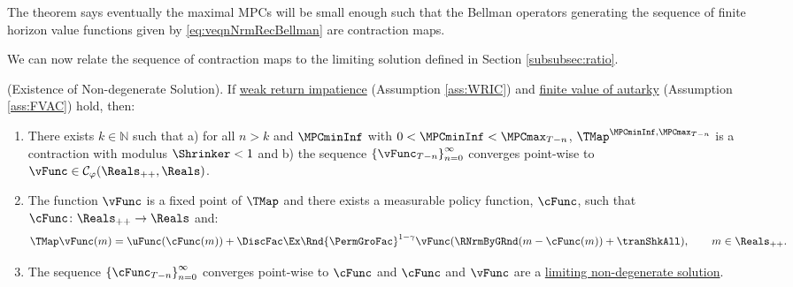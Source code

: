 \documentclass[BufferStockTheory]{subfiles}
\begin{document}
The theorem says eventually the maximal MPCs will be small enough such that the Bellman operators generating the sequence of finite horizon value functions given by \eqref{eq:veqnNrmRecBellman} are contraction maps.

We can now relate the sequence of contraction maps to the limiting solution defined in Section \ref{subsubsec:ratio}.

\hypertarget{Sufficient-Conditions-For-non-degenerate-Solution}{}
\begin{theorem}(Existence of Non-degenerate Solution).
\label{thm:convgtobellman}
If \hyperlink{WRIC}{weak return impatience} (Assumption \ref{ass:WRIC}) and \hyperlink{FVAC}{finite value of autarky} (Assumption \ref{ass:FVAC}) hold, then:
%
\begin{enumerate}[label=(\roman*)]
\item There exists $k\in \mathbb{N}$ such that a) for all $n>k$ and $\MPCminInf$ with $0<\MPCminInf<\MPCmax_{T-n}$, $\TMap^{\MPCminInf, \MPCmax_{T-n}}$ is a contraction with modulus $\Shrinker<1$ and b) the sequence $\left\{\vFunc_{T-n}\right\}_{n=0}^{\infty}$ converges point-wise to $\vFunc \in \mathcal{C}_{\boundFunc}(\Reals_{++},\Reals)$.
\item The function $\vFunc$ is a fixed point of $\TMap$ and there exists a measurable policy function, $\cFunc$, such that $\cFunc\colon \Reals_{++}\rightarrow \Reals$ and:
\begin{equation}\label{eq:stationarybellman}
\TMap\vFunc(m) =  \uFunc(\cFunc(m)) + \DiscFac\Ex \Rnd{\PermGroFac}^{1-\CRRA}\vFunc(\RNrmByGRnd(m-\cFunc(m)) + \tranShkAll) , \qquad m\in \Reals_{++}. 
\end{equation}
\item  The sequence $\left\{\cFunc_{T-n}\right\}_{n=0}^{\infty}$ converges point-wise to $\cFunc$ and $\cFunc$ and $\vFunc$ are a \hyperlink{Definition-of-a-non-degenerate-Solution}{limiting non-degenerate solution}.
\end{enumerate}
\end{theorem}
\end{document}
